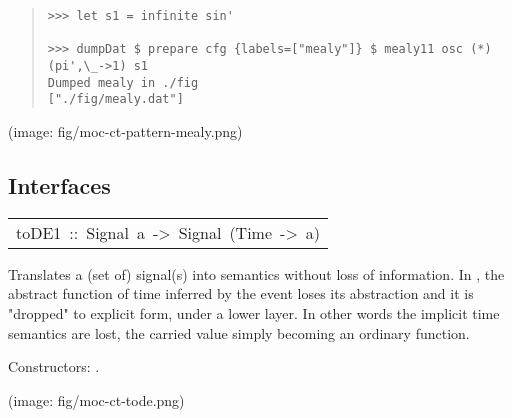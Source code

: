 \begin{haddockdesc}
\begin{quote}
{\begin{verbatim}
>>> let s1 = infinite sin'

>>> dumpDat $ prepare cfg {labels=["mealy"]} $ mealy11 osc (*) (pi',\_->1) s1
Dumped mealy in ./fig
["./fig/mealy.dat"]

\end{verbatim}}
\end{quote}(image: fig/moc-ct-pattern-mealy.png)\par
           
\end{haddockdesc}
\subsection{Interfaces}
\begin{haddockdesc}
\item[\begin{tabular}{@{}l}
toDE1\ ::\ Signal\ a\ ->\ Signal\ (Time\ ->\ a)
\end{tabular}]\haddockbegindoc
Translates a (set of)  signal(s) into
  semantics without loss of information. In
 , the abstract function of time inferred by
 the  event loses its abstraction and it is
 "dropped" to explicit form, under a lower layer. In other words the
 implicit time semantics are lost, the carried value simply becoming
 an ordinary function.\par
Constructors: .\par
(image: fig/moc-ct-tode.png)\par

\end{haddockdesc}
